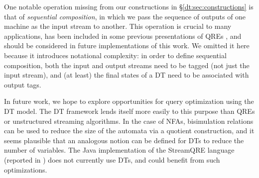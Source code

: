 One notable operation missing from our constructions in \S\ref{dt:sec:constructions} is that of \emph{sequential composition}, in which we pass the sequence of outputs of one machine as the input stream to another. This operation is crucial to many applications, has been included in some previous presentations of QREs \cite{QRE, StreamQRE},
and should be considered in future implementations of this work. We omitted it here because it introduces notational complexity: in order to define sequential composition, both the input and output streams need to be tagged (not just the input stream), and (at least) the final states of a DT need to be associated with output tags.

In future work, we hope to explore opportunities for query optimization using the DT model. The DT framework lends itself more easily to this purpose than QREs or unstructured streaming algorithms. In the case of NFAs, bisimulation relations can be used to reduce the size of the automata via a quotient construction, and it seems plausible that an analogous notion can be defined for DTs to reduce the number of variables. The Java implementation of the StreamQRE language (reported in \cite{StreamQRE}) does not currently use DTs, and could benefit from such optimizations.
